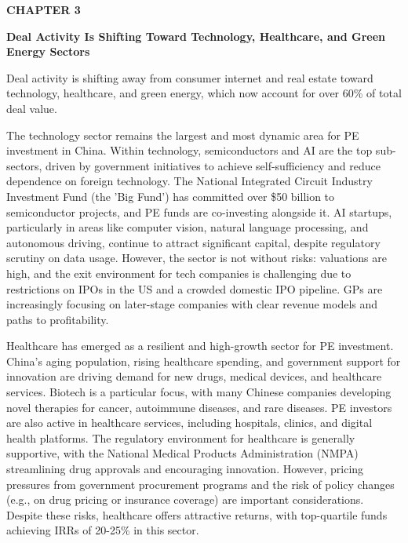 \documentclass[10pt,a4paper]{article}
\begin{document}
\clearpage
\label{chap:3}
{\textcolor{BOBlue}{\scriptsize\bfseries CHAPTER 3}}\par\vspace{-1pt}
{\Large\sffamily\bfseries\color{BONavy} Deal Activity Is Shifting Toward Technology, Healthcare, and Green Energy Sectors}\par\vspace{4pt}
{\textcolor{BOBlue}{\normalsize Deal activity is shifting away from consumer internet and real estate toward technology, healthcare, and green energy, which now account for over 60\% of total deal value.}}\par\vspace{3pt}
\begin{minipage}[t]{0.58\linewidth}
{\small The technology sector remains the largest and most dynamic area for PE investment in China. Within technology, semiconductors and AI are the top sub-sectors, driven by government initiatives to achieve self-sufficiency and reduce dependence on foreign technology. The National Integrated Circuit Industry Investment Fund (the 'Big Fund') has committed over \$50 billion to semiconductor projects, and PE funds are co-investing alongside it. AI startups, particularly in areas like computer vision, natural language processing, and autonomous driving, continue to attract significant capital, despite regulatory scrutiny on data usage. However, the sector is not without risks: valuations are high, and the exit environment for tech companies is challenging due to restrictions on IPOs in the US and a crowded domestic IPO pipeline. GPs are increasingly focusing on later-stage companies with clear revenue models and paths to profitability.}\par
{\small Healthcare has emerged as a resilient and high-growth sector for PE investment. China's aging population, rising healthcare spending, and government support for innovation are driving demand for new drugs, medical devices, and healthcare services. Biotech is a particular focus, with many Chinese companies developing novel therapies for cancer, autoimmune diseases, and rare diseases. PE investors are also active in healthcare services, including hospitals, clinics, and digital health platforms. The regulatory environment for healthcare is generally supportive, with the National Medical Products Administration (NMPA) streamlining drug approvals and encouraging innovation. However, pricing pressures from government procurement programs and the risk of policy changes (e.g., on drug pricing or insurance coverage) are important considerations. Despite these risks, healthcare offers attractive returns, with top-quartile funds achieving IRRs of 20-25\% in this sector.}\par

\end{minipage}
\end{document}
